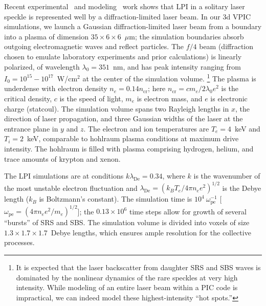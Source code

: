 \documentclass[journal,twoside]{IEEEtran}
\newcommand{\lde}      {\lambda_{\mathrm{De}}}
\newcommand{\wpe}      {\omega_{\mathrm{pe}}}
\begin{document}
Recent experimental~\cite{Kline_PRL_2005} and
modeling~\cite{Yin_et_al_PRL_2007_SRS} work shows that LPI in a
solitary laser speckle is represented well by a diffraction-limited
laser beam.  In our 3d VPIC simulations, we launch a Gaussian
diffraction-limited laser beam from a boundary into a plasma of
dimension $35 \times 6 \times 6$~$\mu$m; the simulation boundaries
absorb outgoing electromagnetic waves and reflect particles.  The
$f/4$ beam (diffraction chosen to emulate laboratory experiments and
prior calculations) is linearly polarized, of wavelength $\lambda_0 =
351$~nm, and has peak intensity ranging from $I_0 = 10^{15} -
10^{17}$~W/cm$^2$ at the center of the simulation volume.
\footnote{It is expected that the laser backscatter from daughter SRS
and SBS waves is dominated by the nonlinear dynamics of the rare
speckles at very high intensity.  While modeling of an entire laser beam
within a PIC code is impractical, we can indeed model these 
highest-intensity ``hot spots.''}  The plasma is underdense with
electron density $n_e = 0.14 n_{\mathrm{cr}}$; here $n_{\mathrm{cr}} =
c m_e / 2 \lambda_0 e^2$ is the critical density, $c$ is the speed of
light, $m_e$ is electron mass, and $e$ is electronic charge
(statcoul).  The simulation volume spans two Rayleigh lengths in $x$,
the direction of laser propagation, and three Gaussian widths of the
laser at the entrance plane in $y$ and $z$.  The electron and ion
temperatures are $T_e = 4$~keV and $T_i = 2$~keV, comparable to
hohlraum plasma conditions at maximum drive intensity.  The hohlraum
is filled with plasma comprising hydrogen, helium, and trace amounts
of krypton and xenon.

The LPI simulations are at conditions $k \lde = 0.34$, where $k$ is
the wavenumber of the most unstable electron fluctuation and $\lde =
(k_B T_e / 4 \pi n_e e^2)^{1/2}$ is the Debye length ($k_B$ is
Boltzmann's constant).  The simulation time is $10^4~\wpe^{-1}$ [$\wpe
= (4 \pi n_e e^2 / m_e)^{1/2}$]; the $0.13 \times 10^6$ time steps
allow for growth of several ``bursts'' of SRS and SBS.  The simulation
volume is divided into voxels of size $1.3 \times 1.7 \times
1.7$~Debye lengths, which ensures ample resolution for the collective
processes.
\end{document}
